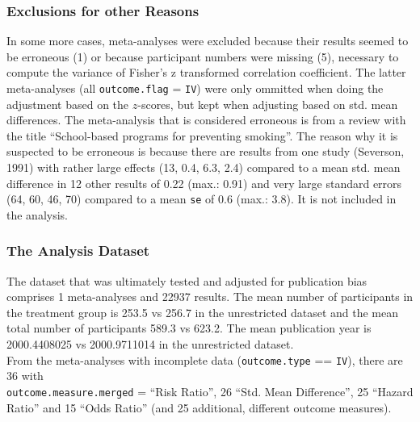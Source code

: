 \documentclass[11pt,a4paper,twoside]{book}\usepackage[]{graphicx}\usepackage[]{color}
\begin{document}
\subsubsection{Exclusions for other Reasons}
In some more cases, meta-analyses were excluded because their results seemed to be erroneous (1) or because participant numbers were missing (5), necessary to compute the variance of Fisher's z transformed correlation coefficient. The latter meta-analyses (all \texttt{outcome.flag} = \texttt{IV}) were only ommitted when doing the adjustment based on the $z$-scores, but kept when adjusting based on std. mean differences. The meta-analysis that is considered erroneous is from a review with the title ``School-based programs for preventing smoking''. The reason why it is suspected to be erroneous is because there are results from one study (Severson, 1991) with rather large effects (13, 0.4, 6.3, 2.4) compared to a mean std. mean difference in 12 other results of 0.22 (max.: 0.91) and very large standard errors (64, 60, 46, 70) compared to a mean \texttt{se} of 0.6 (max.: 3.8). It is not included in the analysis. 

\subsubsection{The Analysis Dataset}
The dataset that was ultimately tested and adjusted for publication bias comprises 1 meta-analyses and 22937 results. The mean number of participants in the treatment group is 253.5 vs 256.7 in the unrestricted dataset and the mean total number of participants 589.3 vs 623.2. The mean publication year is 2000.4408025 vs 2000.9711014 in the unrestricted dataset. \\
From the meta-analyses with incomplete data (\texttt{outcome.type} == \texttt{IV}), there are 36 with \\ \texttt{outcome.measure.merged} = ``Risk Ratio'', 26 ``Std. Mean Difference'',  25 ``Hazard Ratio'' and 15 ``Odds Ratio'' (and 25 additional, different outcome measures).
\end{document}
